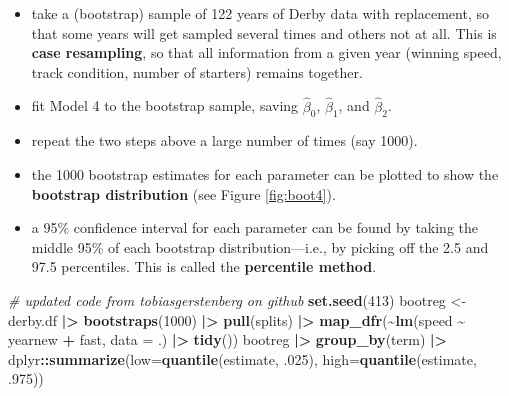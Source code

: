 \documentclass[
]{krantz}
\newenvironment{Shaded}{\begin{snugshade}}{\end{snugshade}}
\newcommand{\AttributeTok}[1]{\textcolor[rgb]{0.27,0.27,0.27}{#1}}
\newcommand{\CommentTok}[1]{\textcolor[rgb]{0.37,0.37,0.37}{\textit{#1}}}
\newcommand{\DecValTok}[1]{\textcolor[rgb]{0.06,0.06,0.06}{#1}}
\newcommand{\FunctionTok}[1]{\textcolor[rgb]{0.27,0.27,0.27}{\textbf{#1}}}
\newcommand{\NormalTok}[1]{#1}
\newcommand{\OtherTok}[1]{\textcolor[rgb]{0.37,0.37,0.37}{#1}}
\newcommand{\SpecialCharTok}[1]{\textcolor[rgb]{0.43,0.43,0.43}{\textbf{#1}}}
\providecommand{\tightlist}{%
  \setlength{\itemsep}{0pt}\setlength{\parskip}{0pt}}
\begin{document}
\begin{itemize}
\tightlist
\item
  take a (bootstrap) sample of 122 years of Derby data with replacement, so that some years will get sampled several times and others not at all. This is \textbf{case resampling},  so that all information from a given year (winning speed, track condition, number of starters) remains together.
\item
  fit Model 4 to the bootstrap sample, saving \(\hat{\beta}_0\), \(\hat{\beta}_1\), and \(\hat{\beta}_2\).
\item
  repeat the two steps above a large number of times (say 1000).
\item
  the 1000 bootstrap estimates for each parameter can be plotted to show the \textbf{bootstrap distribution}  (see Figure \ref{fig:boot4}).
\item
  a 95\% confidence interval for each parameter can be found by taking the middle 95\% of each bootstrap distribution---i.e., by picking off the 2.5 and 97.5 percentiles. This is called the \textbf{percentile method}. 
\end{itemize}

\begin{Shaded}
\begin{Highlighting}[]
\CommentTok{\# updated code from tobiasgerstenberg on github}
\FunctionTok{set.seed}\NormalTok{(}\DecValTok{413}\NormalTok{)}
\NormalTok{bootreg }\OtherTok{\textless{}{-}}\NormalTok{ derby.df }\SpecialCharTok{|\textgreater{}} 
  \FunctionTok{bootstraps}\NormalTok{(}\DecValTok{1000}\NormalTok{) }\SpecialCharTok{|\textgreater{}}
  \FunctionTok{pull}\NormalTok{(splits) }\SpecialCharTok{|\textgreater{}} 
  \FunctionTok{map\_dfr}\NormalTok{(}\SpecialCharTok{\textasciitilde{}}\FunctionTok{lm}\NormalTok{(speed }\SpecialCharTok{\textasciitilde{}}\NormalTok{ yearnew }\SpecialCharTok{+}\NormalTok{ fast, }\AttributeTok{data =}\NormalTok{ .) }\SpecialCharTok{|\textgreater{}} 
            \FunctionTok{tidy}\NormalTok{())}
\NormalTok{bootreg }\SpecialCharTok{|\textgreater{}} 
  \FunctionTok{group\_by}\NormalTok{(term) }\SpecialCharTok{|\textgreater{}} 
\NormalTok{  dplyr}\SpecialCharTok{::}\FunctionTok{summarize}\NormalTok{(}\AttributeTok{low=}\FunctionTok{quantile}\NormalTok{(estimate, .}\DecValTok{025}\NormalTok{),}
            \AttributeTok{high=}\FunctionTok{quantile}\NormalTok{(estimate, .}\DecValTok{975}\NormalTok{))}
\end{Highlighting}
\end{Shaded}
\end{document}
